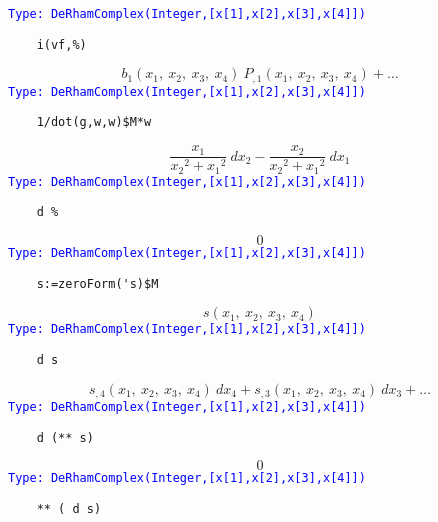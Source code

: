 \documentclass[12pt,a4paper]{article}
\newcommand{\type}[1]{\textcolor{blue}{\tt\tiny #1}}
\begin{document}
\type{Type: DeRhamComplex(Integer,[x[1],x[2],x[3],x[4]])}
\begin{lstlisting}
    i(vf,%) 
\end{lstlisting}
\begin{displaymath}
    {{{b _ {1}} \left(
    {{x _ {1}}, \: {x _ {2}}, \: {x _ {3}}, \: {x _ {4}}} 
    \right)}\  {{P _ {{,1}}} \left(
    {{x _ {1}}, \: {x _ {2}}, \: {x _ {3}}, \: {x _ {4}}} 
    \right)}}+ \ldots
\end{displaymath}
\type{Type: DeRhamComplex(Integer,[x[1],x[2],x[3],x[4]])}
\begin{lstlisting}
    1/dot(g,w,w)$M*w 
\end{lstlisting}
\begin{displaymath}
   {{\frac{x _ {1}}{{{{x _ {2}}} ^ {2}}+{{{x _ {1}}} ^ {2}}}} \  {dx 
    _ {2}}} -{{\frac{x _ {2}}{{{{x _ {2}}} ^ {2}}+{{{x _ {1}}} ^ 
    {2}}}} \  {dx _ {1}}} 
\end{displaymath}
\type{Type: DeRhamComplex(Integer,[x[1],x[2],x[3],x[4]])}
\begin{lstlisting}
    d %
\end{lstlisting}
\begin{displaymath}
    0
\end{displaymath}
\type{Type: DeRhamComplex(Integer,[x[1],x[2],x[3],x[4]])}
\begin{lstlisting}
    s:=zeroForm('s)$M
\end{lstlisting}
\begin{displaymath}
    s \left({{x _ {1}}, \: {x _ {2}}, \: {x _ {3}}, \: {x _ {4}}} 
    \right)
\end{displaymath}
\type{Type: DeRhamComplex(Integer,[x[1],x[2],x[3],x[4]])}
\begin{lstlisting}
    d s
\end{lstlisting}
\begin{displaymath}
 {{{s _ {{,4}}} 
    \left({{x _ {1}}, \: {x _ {2}}, \: {x _ {3}}, \: {x _ {4}}} 
    \right)}\  {dx _ {4}}}+{{{s _ {{,3}}} 
    \left({{x _ {1}}, \: {x _ {2}}, \: {x _ {3}}, \: {x _ {4}}} 
    \right)}\  {dx _ {3}}}+ \ldots
\end{displaymath}
\type{Type: DeRhamComplex(Integer,[x[1],x[2],x[3],x[4]])}
\begin{lstlisting}
    d (** s)
\end{lstlisting}
\begin{displaymath}
   0
\end{displaymath}
\type{Type: DeRhamComplex(Integer,[x[1],x[2],x[3],x[4]])}
\begin{lstlisting}
    ** ( d s)
\end{lstlisting}
\end{document}
